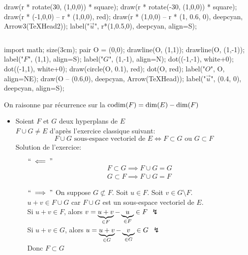 \begin{itemize}
\begin{center}
\begin{asy}
					draw(r * rotate(30, (1,0,0)) * square);
					draw(r * rotate(-30, (1,0,0)) * square);
					draw(r * (-1,0,0) -- r * (1,0,0), red);
					draw(r * (1,0,0) -- r * (1, 0.6, 0), deepcyan, Arrow3(TeXHead2));
					label("$\vec{u}$", r*(1,0.5,0), deepcyan, align=S);
				\end{asy}
				$\qquad$
				\begin{asy}
					import math;
					size(3cm);
					pair O = (0,0);
					drawline(O, (1,1));
					drawline(O, (1,-1));
					label("$F$", (1,1), align=S);
					label("$G$", (1,-1), align=N);
					dot((-1,-1), white+0);
					dot((-1,1), white+0);
					draw(circle(O, 0.1), red);
					dot(O, red);
					label("$O$", O, align=NE);
					draw(O -- (0.6,0), deepcyan, Arrow(TeXHead));
					label("$\vec{u}$", (0.4, 0), deepcyan, align=S);
				\end{asy}
			\end{center}
		On raisonne par récurrence sur la $\operatorname*{codim}(F) = \dim(E) - \dim(F)$
		\begin{itemize}
			\item Soient $F$ et $G$ deux hyperplans de $E$ \\
				$F \cup G \neq E$ d'après l'exercice classique suivant: \[
					F \cup G \text{ sous-espace vectoriel de } E \iff F \subset G \text{ ou } G \subset F
				\] Solution de l'exercice:
				\begin{itemize}
					\item[$``\impliedby"$ ]
						\begin{align*}
							F \subset  G \implies F\cup G = G\\
							G \subset F \implies F\cup G = F
						\end{align*}
					\item[$``\implies"$] On suppose $G \not\subset F$. Soit $u \in F$. Soit $v \in G\setminus F$.\\
						 $u + v \in F\cup G$ car $F \cup G$ est un sous-espace vectoriel de $E$.\\
						 Si $u + v \in F$, alors $v = \underbrace{u + v}_{\in F} - \underbrace{u}_{\mathclap{\in F}} \in F$ $\lightning$\\
						 Si $u + v \in G$, alors $u = \underbrace{u + v}_{\in G} - \underbrace{v}_{\mathclap{\in G}} \in G$ $\lightning$\\ 
						 Donc $F \subset G$
				\end{itemize}


\end{itemize}
\end{itemize}
